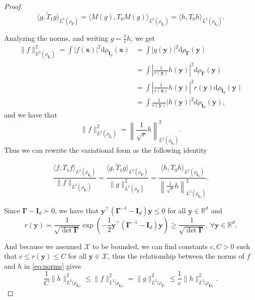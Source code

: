 \begin{proof}
    \begin{equation}\label{eq:quad_forms}
        \langle g, \tilde T_1 g\rangle_{L^2(\rho_{\bm \Gamma})}= \langle M(g), T_0 M(g)\rangle_{L^2(\rho_{\bm I_d})} = \langle h, T_0 h\rangle_{L^2(\rho_{\bm I_d})}.
    \end{equation}
    
    Analyzing the norms, and writing $g = \frac{1}{r}h$, we get
    \begin{align*}
        \|f\|^2_{L^2(\rho_{\bm I_d})} = \int |f(\bm x)|^2 \mathrm d\rho_{\bm I_d}(\bm x) &= \int |g(\bm y)|^2 \mathrm d\rho_{\bm \Gamma}(\bm y) \\
        &= \int \left|\frac{1}{r(\bm y)}h(\bm y)\right|^2 \mathrm d\rho_{\bm \Gamma}(\bm y)\\
        &= \int \left|\frac{1}{r(\bm x)}h(\bm y)\right|^2 r(\bm y)\mathrm d\rho_{\bm I_d}(\bm y) \\
        &=  \int \frac{1}{r(\bm y)}|h(\bm y)|^2 \mathrm d\rho_{\bm I_d}(\bm y),
    \end{align*}
    and we have that
    \begin{equation}\label{eq:norms}    
        \|f\|^2_{L^2(\rho_{\bm I_d})} = \left\|\frac{1}{\sqrt r}h\right\|^2_{L^2(\rho_{\bm I_d})}.
    \end{equation}
    Thus we can rewrite the variational form as the following identity
    
    \begin{equation}\label{eq:var_forms}
        \frac{\langle f, T_1 f\rangle_{L^2(\rho_{\bm I_d})}}{\|f\|_{L^2(\rho_{\bm I_d})}} = \frac{\langle g, \tilde T_1 g\rangle_{L^2(\rho_{\bm \Gamma})}}{\|g\|^2_{L^2(\rho_{\bm \Gamma})}} = \frac{\langle h, T_0 h\rangle_{L^2(\rho_{\bm I_d})}}{\left\|\frac{1}{\sqrt r} h\right\|^2_{L^2(\rho_{\bm I_d})}}.
    \end{equation}
    
    Since $\bm \Gamma - \bm I_d \succ 0$, we have that $\bm y^\top (\bm \Gamma^{-1} - \bm I_d)\bm y \leq 0$ for all $\bm y \in \mathbb R^d$ and
    \[
        r(\bm y) =  \frac{1}{\sqrt{\det \bm \Gamma}}\exp\left(-\frac{1}{2}\bm y^\top (\bm \Gamma^{-1} - \bm I_d)\bm y\right) \geq \frac{1}{\sqrt{\det \bm \Gamma}}, \ \forall \bm y \in \mathbb R^d.
    \]
    
    And because we assumed $\mathcal X$  to be bounded, we can find constants $c, C > 0$ such that $c\leq r(\bm y) \leq C$ for all $\bm y \in \mathcal X$, thus the relationship between the norms of $f$ and $h$ in \cref{eq:norms} gives
    \[
        \frac{1}{C}\|h\|^2_{L^2(\rho_{\bm I_d)}} \leq \|f\|^2_{L^2(\rho_{\bm I_d)}} = \|g\|^2_{L^2(\rho_{\bm \Gamma)}}\leq \frac{1}{c}\|h\|^2_{L^2(\rho_{\bm Id)}}.
    \]
    

\end{proof}
